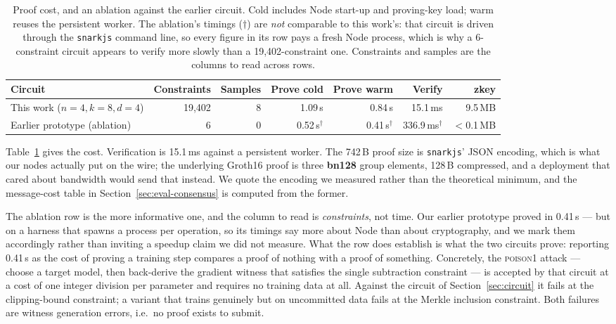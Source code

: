 \documentclass{llncs}
\begin{document}
\begin{table}[t]
\centering
\caption{Proof cost, and an ablation against the earlier circuit. Cold includes
Node start-up and proving-key load; warm reuses the persistent worker. The
ablation's timings ($\dagger$) are \emph{not} comparable to this work's: that
circuit is driven through the \texttt{snarkjs} command line, so every figure in
its row pays a fresh Node process, which is why a 6-constraint circuit appears
to verify more slowly than a 19{,}402-constraint one. Constraints and samples
are the columns to read across rows.}
\label{tab:proof}
\begin{tabular}{lrrrrrr}
\toprule
\textbf{Circuit} & \textbf{Constraints} & \textbf{Samples} &
\textbf{Prove cold} & \textbf{Prove warm} & \textbf{Verify} & \textbf{zkey} \\
\midrule
This work ($n{=}4,k{=}8,d{=}4$) & 19{,}402 & 8 & 1.09\,s &
  0.84\,s & 15.1\,ms & 9.5\,MB \\
Earlier prototype (ablation)    & 6        & 0 & 0.52\,s$^\dagger$ &
  0.41\,s$^\dagger$ & 336.9\,ms$^\dagger$ & $<$0.1\,MB \\
\bottomrule
\end{tabular}
\end{table}

Table~\ref{tab:proof} gives the cost. Verification is 15.1\,ms against a
persistent worker. The 742\,B proof size is \texttt{snarkjs}' JSON encoding,
which is what our nodes actually put on the wire; the underlying Groth16 proof
is three \textbf{bn128} group elements, 128\,B compressed, and a deployment that
cared about bandwidth would send that instead. We quote the encoding we
measured rather than the theoretical minimum, and the message-cost table in
Section~\ref{sec:eval-consensus} is computed from the former.

The ablation row is the more informative one, and the column to read is
\emph{constraints}, not time. Our earlier prototype proved in
0.41\,s --- but on a harness that spawns a process per operation, so its timings
say more about Node than about cryptography, and we mark them accordingly rather
than inviting a speedup claim we did not measure. What the row does establish is
what the two circuits prove: reporting 0.41\,s as the cost of proving a training
step compares a proof of nothing with a proof of something. Concretely, the
\textsc{poison1} attack --- choose a target model, then back-derive the gradient
witness that satisfies the single subtraction constraint --- is accepted by that
circuit at a cost of one integer division per parameter and requires no training
data at all. Against the circuit of Section~\ref{sec:circuit} it fails at the
clipping-bound constraint; a variant that trains genuinely but on uncommitted
data fails at the Merkle inclusion constraint. Both failures are witness
generation errors, i.e.\ no proof exists to submit.
\end{document}

